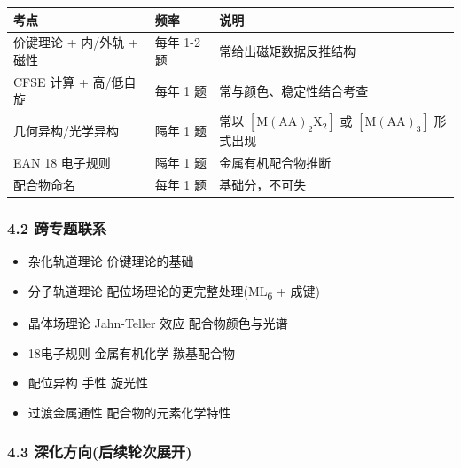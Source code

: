 {\def\LTcaptype{none} %
\begin{longtable}[]{@{}
  >{\raggedright\arraybackslash}p{}
  >{\centering\arraybackslash}p{}
  >{\raggedright\arraybackslash}p{}@{}}
\toprule\noalign{}
\begin{minipage}[b]{\linewidth}\raggedright
考点
\end{minipage} & \begin{minipage}[b]{\linewidth}\centering
频率
\end{minipage} & \begin{minipage}[b]{\linewidth}\raggedright
说明
\end{minipage} \\
\midrule\noalign{}
\endhead
\bottomrule\noalign{}
\endlastfoot
价键理论 + 内/外轨 + 磁性 & 每年 1-2 题 & 常给出磁矩数据反推结构 \\
CFSE 计算 + 高/低自旋 & 每年 1 题 & 常与颜色、稳定性结合考查 \\
几何异构/光学异构 & 隔年 1 题 & 常以 \([\mathrm{M(AA)_2X_2}]\) 或 \([\mathrm{M(AA)_3}]\) 形式出现 \\
EAN 18 电子规则 & 隔年 1 题 & 金属有机配合物推断 \\
配合物命名 & 每年 1 题 & 基础分，不可失 \\
\end{longtable}
}

\subsubsection{4.2 跨专题联系}\label{ux8de8ux4e13ux9898ux8054ux7cfb}

\begin{itemize}
\tightlist
\item
  杂化轨道理论 \箭 价键理论的基础
\item
  分子轨道理论 \箭 配位场理论的更完整处理(ML\textsubscript{6}  + \派 成键)
\item
  晶体场理论 \箭 Jahn-Teller 效应 \箭 配合物颜色与光谱
\item
  18电子规则 \箭 金属有机化学 \箭 羰基配合物
\item
  配位异构 \箭 手性 \箭 旋光性
\item
  过渡金属通性 \箭 配合物的元素化学特性
\end{itemize}

\subsubsection{4.3 深化方向(后续轮次展开)}\label{ux6df1ux5316ux65b9ux5411ux540eux7eedux8f6eux6b21ux5c55ux5f00}

